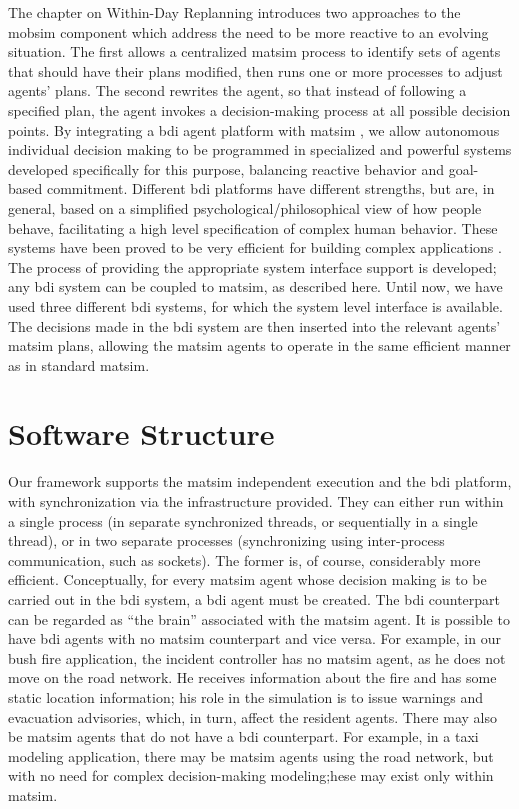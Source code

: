 The chapter on Within-Day Replanning introduces two approaches to the
\gls{mobsim} component which address the need to be more reactive to an
evolving situation. The first allows a centralized \gls{matsim} process to
identify sets of agents that should have their plans modified, then
runs one or more processes to adjust agents' plans. The
second rewrites the agent, so that instead of
following a specified plan, the agent invokes a decision-making
process at all possible decision points. By integrating a \gls{bdi} agent
platform with \gls{matsim} \citep{ecai}, we allow autonomous individual
decision making to be programmed in specialized and powerful systems
developed specifically for this purpose, balancing
reactive behavior and goal-based commitment. Different \gls{bdi} platforms
have different strengths, but are, in general, based on a simplified
psychological/philosophical view of how people behave, facilitating a
high level specification of complex human behavior. These systems have
been proved to be very efficient for building complex
applications \citep{benfield}.  The process of providing the appropriate system
interface support is developed; any \gls{bdi} system can be coupled to
\gls{matsim}, as described here. Until now, we have used three different \gls{bdi}
systems, for which the system level interface is available.  The
decisions made in the \gls{bdi} system are then inserted into the relevant agents' \gls{matsim}
plans, allowing the \gls{matsim} agents to operate in
the same efficient manner as in standard \gls{matsim}.

\section{Software Structure}
\label{sec:bdi-structure}
Our framework supports the \gls{matsim} independent execution and the \gls{bdi} platform, with 
synchronization via the infrastructure provided.
They can either run within a single process (in
separate synchronized threads, or sequentially in a single thread), or in two
separate processes (synchronizing using inter-process communication, such as
sockets). The former is, of course, considerably more efficient. 
%
Conceptually, for every \gls{matsim} agent whose decision making is to be
carried out in the \gls{bdi} system, a \gls{bdi} agent must be created. The \gls{bdi} counterpart can
be regarded as ``the brain'' associated with the \gls{matsim} agent. It is
possible to have \gls{bdi} agents with no \gls{matsim} counterpart and vice
versa. For example, in our bush fire application, the incident
controller has no \gls{matsim} agent, as he does not move on the road
network. He receives information about the fire and has some static
location information;  his role in the simulation is to issue
warnings and evacuation advisories, which, in turn, affect the resident
agents. There may also be \gls{matsim} agents that do not have a \gls{bdi}
counterpart. For example, in a taxi modeling application, there may be
\gls{matsim} agents using the road network, but with no need for
complex decision-making modeling;hese may exist only within
\gls{matsim}. 

